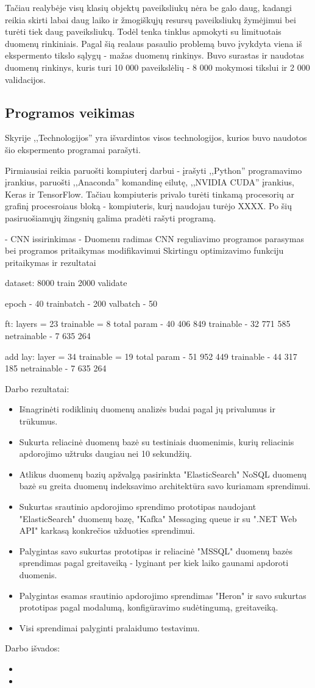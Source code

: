 \documentclass{VUMIFPSkursinis}
\begin{document}
Tačiau realybėje visų klasių objektų paveiksliukų nėra be galo daug, kadangi reikia skirti labai daug laiko ir žmogiškųjų resursų paveiksliukų žymėjimui bei turėti tiek daug paveiksliukų. Todėl tenka tinklus apmokyti su limituotais duomenų rinkiniais. Pagal šią realaus pasaulio problemą buvo įvykdyta viena iš ekspermento tikslo sąlygų - mažas duomenų rinkinys. Buvo surastas ir naudotas duomenų rinkinys, kuris turi 10 000 paveikslėlių - 8 000 mokymosi tikslui ir 2 000 validacijos.

\subsection{Programos veikimas}
Skyrije ,,Technologijos'' yra išvardintos visos technologijos, kurios buvo naudotos šio ekspermento programai parašyti.

Pirmiausiai reikia paruošti kompiuterį darbui - įrašyti ,,Python'' programavimo įrankius, paruošti ,,Anaconda'' komandinę eilutę, ,,NVIDIA CUDA'' įrankius, Keras ir TensorFlow. Tačiau kompiuteris privalo turėti tinkamą procesorių ar grafinį procesroiaus bloką - kompiuteris, kurį naudojau turėjo XXXX. Po šių pasiruošiamųjų žingsnių galima pradėti rašyti programą.


- CNN issirinkimas
- Duomenu radimas
CNN reguliavimo programos parasymas
bei programos pritaikymas modifikavimui
Skirtingu optimizavimo funkciju pritaikymas ir rezultatai


dataset:
8000 train
2000 validate

epoch - 40
trainbatch - 200
valbatch - 50

ft:
layers = 23
trainable = 8
total param - 40 406 849
trainable - 32 771 585
netrainable - 7 635 264

add lay:
layer = 34 
trainable = 19
total param - 51 952 449
trainable - 44 317 185
netrainable - 7 635 264

Darbo rezultatai:
\begin{itemize}
    \item Išnagrinėti rodiklinių duomenų analizės budai pagal jų privalumus ir trūkumus.
    \item Sukurta reliacinė duomenų bazė su testiniais duomenimis, kurių reliacinis apdorojimo užtruks daugiau nei 10 sekundžių.
    \item Atlikus duomenų bazių apžvalgą pasirinkta "ElasticSearch" NoSQL duomenų bazė su greita duomenų indeksavimo architektūra savo kuriamam sprendimui.
    \item Sukurtas srautinio apdorojimo sprendimo prototipas naudojant "ElasticSearch" duomenų bazę, "Kafka" Messaging queue ir su ".NET Web API" karkasą konkrečios užduoties sprendimui.   
    \item Palygintas savo sukurtas prototipas ir reliacinė "MSSQL" duomenų bazės sprendimas pagal greitaveiką - lyginant per kiek laiko gaunami apdoroti duomenis.   
    \item Palygintas esamas srautinio apdorojimo sprendimas "Heron" ir savo sukurtas prototipas pagal modalumą, konfigūravimo sudėtingumą, greitaveiką.   
    \item Visi sprendimai palyginti pralaidumo testavimu.
\end{itemize}


Darbo išvados:
\begin{itemize}
\item 
\item
\end{itemize}

\printbibliography[heading=bibintoc] 
\end{document}
